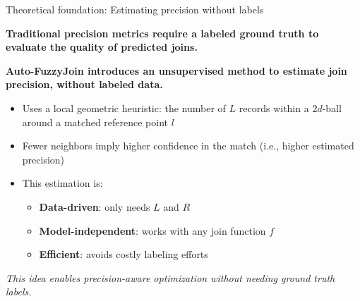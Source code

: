 \documentclass[8pt]{beamer} %
\begin{document}
\begin{frame}{Theoretical foundation: Estimating precision without labels}
	

	\textbf{Traditional precision metrics require a labeled ground truth to evaluate the quality of predicted joins.}
	
	\vspace{1em}
	
	\textbf{Auto-FuzzyJoin introduces an unsupervised method to estimate join precision, without labeled data.}
	
	\vspace{1em}
	\begin{itemize}
		\item Uses a local geometric heuristic: the number of $L$ records within a $2d$-ball around a matched reference point $l$
		\item Fewer neighbors imply higher confidence in the match (i.e., higher estimated precision)
		\item This estimation is:
		\begin{itemize}
			\item \textbf{Data-driven}: only needs $L$ and $R$
			\item \textbf{Model-independent}: works with any join function $f$
			\item \textbf{Efficient}: avoids costly labeling efforts
		\end{itemize}
	\end{itemize}
	
	\vspace{0.5em}
	\textit{This idea enables precision-aware optimization without needing ground truth labels.}
	
\end{frame}
\end{document}

